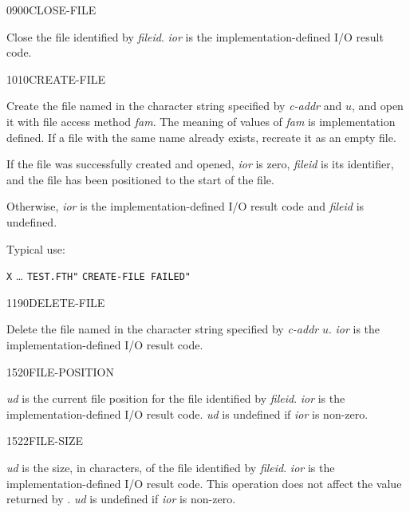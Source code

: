 \begin{newword}{0900}{CLOSE-FILE}

	Close the file identified by \emph{fileid}. \emph{ior} is the
	implementation-defined I/O result code.
\end{newword}


\begin{newword}{1010}{CREATE-FILE}

	Create the file named in the character string specified by
	\emph{c-addr} and $u$, and open it with file access method
	\emph{fam}. The meaning of values of \emph{fam} is
	implementation defined. If a file with the same name already
	exists, recreate it as an empty file.

	If the file was successfully created and opened, \emph{ior} is
	zero, \emph{fileid} is its identifier, and the file has been
	positioned to the start of the file.

	Otherwise, \emph{ior} is the implementation-defined I/O result
	code and \emph{fileid} is undefined.

	\begin{rationale} %
		Typical use:

		\tab \word[core]{:} \texttt{X} {\ldots}
				 \texttt{TEST.FTH"} 
				 \texttt{CREATE-FILE FAILED"}
			\word[core]{;}
	\end{rationale}
\end{newword}


\begin{newword}{1190}{DELETE-FILE}

	Delete the file named in the character string specified by
	\emph{c-addr} $u$. \emph{ior} is the implementation-defined
	I/O result code.
\end{newword}


\begin{newword}{1520}{FILE-POSITION}

	\emph{ud} is the current file position for the file identified
	by \emph{fileid}. \emph{ior} is the implementation-defined I/O
	result code. \emph{ud} is undefined if \emph{ior} is non-zero.
\end{newword}


\begin{newword}{1522}{FILE-SIZE}

	\emph{ud} is the size, in characters, of the file identified by
	\emph{fileid}. \emph{ior} is the implementation-defined I/O
	result code. This operation does not affect the value returned
	by . \emph{ud} is undefined if \emph{ior}
	is non-zero.
\end{newword}


